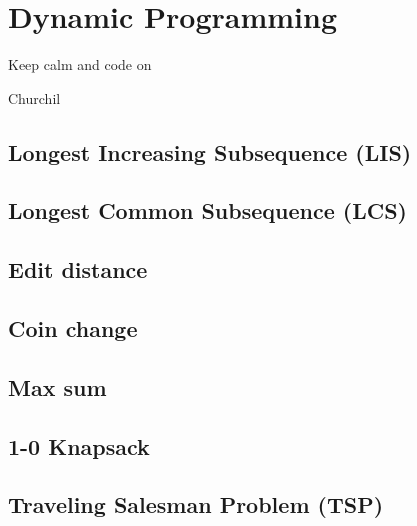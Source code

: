 \chapter{Dynamic Programming}
	\epigraph{Keep calm and code on}{Churchil}
	\section{Longest Increasing Subsequence (LIS)}
		
	\section{Longest Common Subsequence (LCS)}
	\section{Edit distance}
	\section{Coin change}
	\section{Max sum}
	\section{1-0 Knapsack}
	\section{Traveling Salesman Problem (TSP)}
